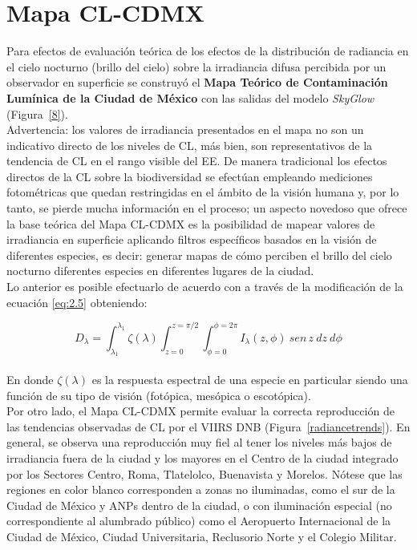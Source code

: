 \newpage

\section{Mapa CL-CDMX}
\label{sec:mapacl}

Para efectos de evaluación teórica de los efectos de la distribución de radiancia en el cielo nocturno (brillo del cielo) sobre la irradiancia difusa percibida por un observador en superficie se construyó el \textbf{Mapa Teórico de Contaminación Lumínica de la Ciudad de México} con las salidas del modelo \textit{SkyGlow} (Figura~\ref{8}).\\

Advertencia: los valores de irradiancia presentados en el mapa no son un indicativo directo de los niveles de CL, más bien, son representativos de la tendencia de CL en el rango visible del EE. De manera tradicional los efectos directos de la CL sobre la biodiversidad se efectúan empleando mediciones fotométricas que quedan restringidas en el ámbito de la visión humana y, por lo tanto, se pierde mucha información en el proceso; un aspecto novedoso que ofrece la base teórica del Mapa CL-CDMX es la posibilidad de mapear valores de irradiancia en superficie aplicando filtros específicos basados en la visión de diferentes especies, es decir: generar mapas de cómo perciben el brillo del cielo nocturno diferentes especies en diferentes lugares de la ciudad.\\

Lo anterior es posible efectuarlo de acuerdo con \cite{Solano2013} a través de la modificación de la ecuación \ref{eq:2.5} obteniendo:

\begin{equation}
D_{\lambda} = \int_{\lambda_{1}}^{\lambda_{1}} \zeta(\lambda) \int_{z = 0}^{z =\pi/2} \int_{\phi = 0}^{\phi = 2\pi} I_{\lambda} (z, \phi) \: sen \,z \: dz \: d\phi
\end{equation}\\


En donde $\zeta(\lambda)$ es la respuesta espectral de una especie en particular siendo una función de su tipo de visión (fotópica, mesópica o escotópica).\\

Por otro lado, el Mapa CL-CDMX permite evaluar la correcta reproducción de las tendencias observadas de CL por el VIIRS DNB (Figura~\ref{radiancetrends}). En general, se observa una reproducción muy fiel al tener los niveles más bajos de irradiancia fuera de la ciudad y los mayores en el Centro de la ciudad integrado por los Sectores Centro, Roma, Tlatelolco, Buenavista y Morelos. Nótese que las regiones en color blanco corresponden a zonas no iluminadas, como el sur de la Ciudad de México y ANPs dentro de la ciudad, o con iluminación especial (no correspondiente al alumbrado público) como el Aeropuerto Internacional de la Ciudad de México, Ciudad Universitaria, Reclusorio Norte y el Colegio Militar.\\

